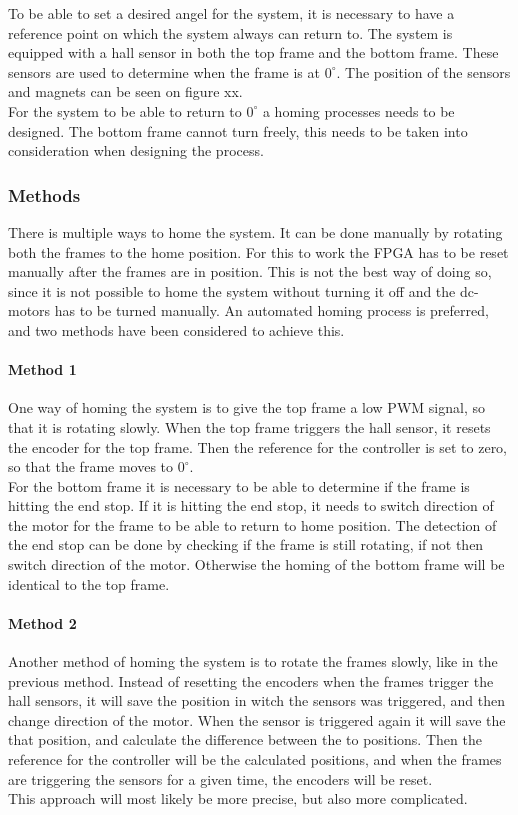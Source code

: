 \documentclass[../../../main]{subfiles}
\begin{document}
 
To be able to set a desired angel for the system, it is necessary to have a reference point on which the system always can return to. 
The system is equipped with a hall sensor in both the top frame and the bottom frame.
These sensors are used to determine when the frame is at $0^\circ$. The position of the sensors and magnets can be seen on figure xx. 
\\
For the system to be able to return to $0^\circ$ a homing processes needs to be designed.
The bottom frame cannot turn freely, this needs to be taken into consideration when designing the process.
\subsubsection{Methods} 
There is multiple ways to home the system. It can be done manually by rotating both the frames to the home position.
For this to work the FPGA has to be reset manually after the frames are in position.
This is not the best way of doing so, since it is not possible to home the system without turning it off and the dc-motors has to be turned manually.
An automated homing process is preferred, and two methods have been considered to achieve this. 

\paragraph{Method 1}%
\label{par:method_1}
One way of homing the system is to give the top frame a low PWM signal, so that it is rotating slowly. 
When the top frame triggers the hall sensor, it resets the encoder for the top frame. 
Then the reference for the controller is set to zero, so that the frame moves to $0^\circ$. 
\\
For the bottom frame it is necessary to be able to determine if the frame is hitting the end stop. 
If it is hitting the end stop, it needs to switch direction of the motor for the frame to be able to return to home position.
The detection of the end stop can be done by checking if the frame is still rotating, if not then switch direction of the motor.
Otherwise the homing of the bottom frame will be identical to the top frame.

\paragraph{Method 2}%
\label{par:method_2}
Another method of homing the system is to rotate the frames slowly, like in the previous method. 
Instead of resetting the encoders when the frames trigger the hall sensors, it will save the position in witch the sensors was triggered, and then change direction of the motor.
When the sensor is triggered again it will save the that position, and calculate the difference between the to positions. 
Then the reference for the controller will be the calculated positions, and when the frames are triggering the sensors for a given time, the encoders will be reset.
\\
This approach will most likely be more precise, but also more complicated. 
\end{document}
